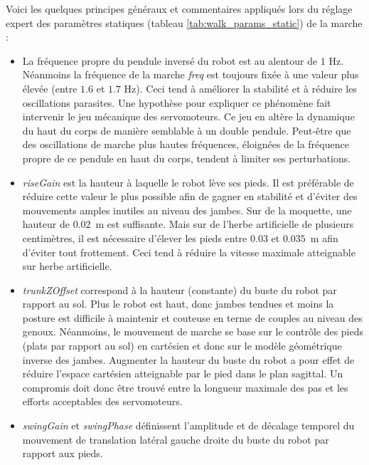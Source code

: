 Voici les quelques principes généraux et commentaires appliqués lors 
du réglage expert des paramètres statiques (tableau \ref{tab:walk_params_static}) 
de la marche :
\begin{itemize}
    \item La fréquence propre du pendule inversé du robot est au alentour de $1$ Hz. 
        Néanmoins la fréquence de la marche \textit{freq} est toujours fixée 
        à une valeur plus élevée (entre $1.6$ et $1.7$ Hz).
        Ceci tend à améliorer la stabilité et à réduire les oscillations parasites.
        Une hypothèse pour expliquer ce phénomène fait intervenir le jeu mécanique
        des servomoteurs.
        Ce jeu en altère la dynamique du haut du corps de manière 
        semblable à un double pendule.
        Peut-être que des oscillations de marche plus hautes fréquences, 
        éloignées de la fréquence propre de ce pendule en haut du corps, 
        tendent à limiter ses perturbations.
    \item \textit{riseGain} est la hauteur à laquelle le robot lève ses pieds.
        Il est préférable de réduire cette valeur le plus possible afin de gagner
        en stabilité et d'éviter des mouvements amples inutiles au niveau des jambes.
        Sur de la moquette, une hauteur de $0.02$~m est suffisante. 
        Mais sur de l'herbe artificielle de plusieurs centimètres, il est nécessaire d'élever
        les pieds entre $0.03$ et $0.035$~m afin d'éviter tout frottement.
        Ceci tend à réduire la vitesse maximale atteignable sur herbe artificielle. 
    \item \textit{trunkZOffset} correspond à la hauteur (constante) du buste 
        du robot par rapport au sol. Plus le robot est haut, donc jambes tendues
        et moins la posture est difficile à maintenir et couteuse en terme
        de couples au niveau des genoux. Néanmoins, le mouvement de
        marche se base sur le contrôle des pieds (plats par rapport au sol) 
        en cartésien et donc sur le modèle géométrique inverse des jambes. 
        Augmenter la hauteur du buste du robot a pour effet de réduire l'espace cartésien 
        atteignable par le pied dans le plan sagittal. 
        Un compromis doit donc être trouvé entre
        la longueur maximale des pas et les efforts acceptables des servomoteurs.
    \item \textit{swingGain} et \textit{swingPhase} définissent l'amplitude et de décalage 
        temporel du mouvement de translation latéral gauche droite du buste 
        du robot par rapport aux pieds.

\end{itemize}
